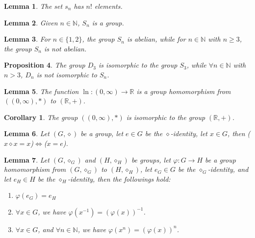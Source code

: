 \documentclass[11pt]{article}
\theoremstyle{break}
\theoremstyle{break}
\newtheorem{lem}{Lemma}[thm]
\newtheorem{prop}[lem]{Proposition}
\newtheorem{corL}{Corollary}[lem]
\newcommand{\R}{\mathbb{R}}
\newcommand{\N}{\mathbb{N}}
\begin{document}
	\begin{lem}
		The set $s_n$ has $n!$ elements.
	\end{lem}
	
	\begin{lem}
		Given $n \in \N$, $S_n$ is a group.
	\end{lem}
	
	\begin{lem}
		For $n \in \{1,2\}$, the group $S_n$ is abelian, while for $n \in \N$ with $n \geq 3$, the group $S_n$ is not abelian.
	\end{lem}
	
	\begin{prop}
		The group $D_3$ is isomorphic to the group $S_3$, while $\forall n \in \N$ with $n>3$, $D_n$ is not isomorphic to $S_n$.
	\end{prop}
	
	\begin{lem}
		The function $\ln:(0,\infty) \to \R$ is a group homomorphism from $((0,\infty),\ast)$ to $(\R,+)$.
	\end{lem}
	
	\begin{corL}
		The group $((0,\infty),\ast)$ is isomorphic to the group $(\R,+)$.
	\end{corL}
	
	\begin{lem}
		Let $(G,\diamond)$ be a group, let $e \in G$ be the $\diamond$-identity, let $x \in G$, then ($x \diamond x = x$)$\iff$($x=e$).
	\end{lem}
	
	\begin{lem}
		Let $(G,\diamond_G)$ and $(H,\diamond_H)$ be groups, let $\varphi:G \to H$ be a group homomorphism from $(G,\diamond_G)$ to $(H,\diamond_H)$, let $e_G \in G$ be the $\diamond_G$-identity, and let $e_H \in H$ be the $\diamond_H$-identity, then the followings hold:
		\begin{enumerate}[topsep=3pt,itemsep=-1ex,partopsep=1ex,parsep=1ex]
		\item $\varphi (e_G) = e_H$
		\item $\forall x \in G$, we have $\varphi (x^{-1}) = (\varphi(x))^{-1}$.
		\item $\forall x \in G$, and $\forall n \in \N$, we have $\varphi(x^n) = (\varphi(x))^n$.
		\end{enumerate}
	\end{lem} 
	

\clearpage
	
	
	
\end{document}
